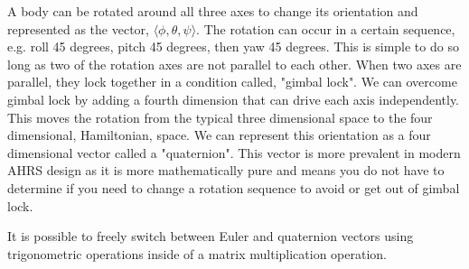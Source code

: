 A body can be rotated around all three axes to change its orientation and represented as the vector, $\langle\phi, \theta, \psi\rangle$.
The rotation can occur in a certain sequence, e.g. roll 45 degrees, pitch 45 degrees, then yaw 45 degrees.
This is simple to do so long as two of the rotation axes are not parallel to each other.
When two axes are parallel, they lock together in a condition called, "gimbal lock". 
We can overcome gimbal lock by adding a fourth dimension that can drive each axis independently.
This moves the rotation from the typical three dimensional space to the four dimensional, Hamiltonian, space.
We can represent this orientation as a four dimensional vector called a "quaternion".
This vector is more prevalent in modern AHRS design as it is more mathematically pure and means you do not have to determine if you need to change a rotation sequence to avoid or get out of gimbal lock.

It is possible to freely switch between Euler and quaternion vectors using trigonometric operations inside of a matrix multiplication operation.

